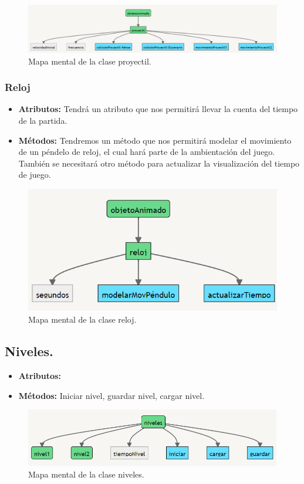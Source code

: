 \documentclass{article}
\begin{document}
\begin{figure}[h]
\includegraphics[scale=0.5]{Images/proyectil.png}
\centering
\caption{Mapa mental de la clase proyectil.}
\label{fig:func1}
\end{figure}
    
    
    \subsubsection{Reloj}
    \begin{itemize}
        \item \textbf{Atributos:} Tendrá un atributo que nos permitirá llevar la cuenta del tiempo de la partida.
        \item \textbf{Métodos:} Tendremos un método que nos permitirá modelar el movimiento de un péndelo de reloj, el cual hará parte de la ambientación del juego. También se necesitará otro método para actualizar la visualización del tiempo de juego.
    \end{itemize}
    
    
\begin{figure}[h]
\includegraphics[scale=0.8]{Images/reloj.png}
\centering
\caption{Mapa mental de la clase reloj.}
\label{fig:func1}
\end{figure}


\subsection{Niveles.}\label{niveles}
\begin{itemize}
  \item \textbf{Atributos:}  
  
  \item \textbf{Métodos:} Iniciar nivel, guardar nivel, cargar nivel.
\end{itemize}

\begin{figure}[h]
\includegraphics[scale=0.8]{Images/niveles.png}
\centering
\caption{Mapa mental de la clase niveles.}
\label{fig:func1}
\end{figure}
\end{document}
